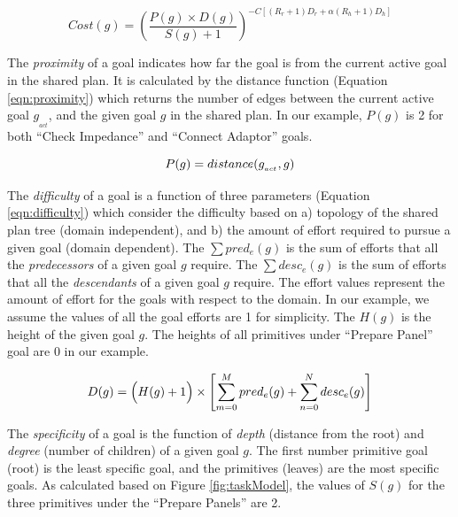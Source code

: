 \documentclass[conference]{IEEEtran}
\begin{document}
\vspace*{-4mm}
\begin{equation}
Cost(g) = \left(\frac{P(g)\times D(g)}{S(g)+1}\right)^{-C[(R_r+1)D_r + \alpha
(R_h+1)D_h]}
\label{eqn:cost}
\end{equation}

The \textit{proximity} of a goal indicates how far the goal is from the current
active goal in the shared plan. It is calculated by the distance function
(Equation \ref{eqn:proximity}) which returns the number of edges between the
current active goal $g_{_{act}}$, and the given goal $g$ in the shared plan. In
our example, $P(g)$ is 2 for both ``Check Impedance'' and ``Connect Adaptor''
goals.

\vspace*{-3mm}
\begin{equation}
P(g) =  distance(g_{_{act}},g)
\label{eqn:proximity}
\vspace*{-2mm}
\end{equation}

The \textit{difficulty} of a goal is a function of three parameters (Equation
\ref{eqn:difficulty}) which consider the difficulty based on a) topology of the
shared plan tree (domain independent), and b) the amount of effort required to
pursue a given goal (domain dependent). The $\sum pred_e(g)$ is the sum of
efforts that all the \textit{predecessors} of a given goal $g$ require. The
$\sum desc_e(g)$ is the sum of efforts that all the \textit{descendants} of a
given goal $g$ require. The effort values represent the amount of effort for the
goals with respect to the domain. In our example, we assume the values of all
the goal efforts are 1 for simplicity. The $H(g)$ is the height of the given
goal $g$. The heights of all primitives under ``Prepare Panel'' goal are 0 in
our example.

\vspace*{-5mm}
\begin{equation}
D(g) = \Big(H(g)+1\Big)\times\left[\sum\limits_{m=0}^{M} pred_e(g) +
\sum\limits_{n=0}^{N} desc_e(g)\right]
\label{eqn:difficulty}
\vspace*{-1mm}
\end{equation}

The \textit{specificity} of a goal is the function of \textit{depth} (distance
from the root) and \textit{degree} (number of children) of a given goal $g$. The
first number primitive goal (root) is the least specific goal, and the
primitives (leaves) are the most specific goals. As calculated based on Figure
\ref{fig:taskModel}, the values of $S(g)$ for the three primitives under the
``Prepare Panels'' are 2.
\end{document}
